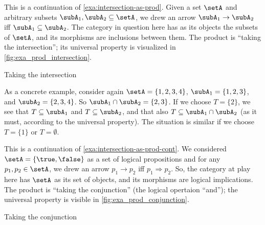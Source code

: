 \begin{example}\label{exa:intersection-as-prod-cont}
This is a continuation of \cref{exa:intersection-as-prod}.
Given a set $\setA$ and arbitrary subsets $\subA_1, \subA_2 \subseteq \setA$, we drew an arrow $\subA_1 \to \subA_2$ iff $\subA_1 \subseteq \subA_2$. The category in question here has as its objects the subsets of $\setA$, and its morphisms are inclusions between them. The product is ``taking the intersection''; its universal property is visualized in \cref{fig:exa_prod_intersection}. 
  \begin{marginfigure}
  \begin{center}
  \end{center}
    \caption{Taking the intersection}
    \label{fig:exa_prod_intersection_cont}
  \end{marginfigure}
 As a concrete example, consider again $\setA = \{ 1, 2, 3, 4 \}$, $\subA_1 = \{ 1, 2, 3 \}$, and $\subA_2 = \{2, 3, 4 \}$. So $\subA_1 \cap \subA_2 = \{2, 3 \}$. If we choose $T = \{ 2 \}$, we see that $T \subseteq \subA_1$ and $T \subseteq \subA_2$, and that also $T \subseteq \subA_1 \cap \subA_2$ (as it must, according to the universal property). The situation is similar if we choose $T = \{ 1\}$ or $T = \emptyset$. 
\end{example}


\begin{example}\label{exa:intersection-as-prod-cont}
This is a continuation of \cref{exa:intersection-as-prod-cont}. We considered $\setA = \{ \true, \false \}$ as a set of logical propositions and for any $p_1, p_2  \in \setA$, we drew an arrow $p_1 \to p_2$ iff $p_1 \Rightarrow p_2$. So, the category at play here has $\setA$ as its set of objects, and its morphisms are logical implications. The product is ``taking the conjunction'' (the logical opertaion ``and''); the universal property is visible in \cref{fig:exa_prod_conjunction}. 
  \begin{marginfigure}
  \begin{center}
  \end{center}
    \caption{Taking the conjunction}
    \label{fig:exa_prod_conjunction_cont}
  \end{marginfigure}
\end{example}


